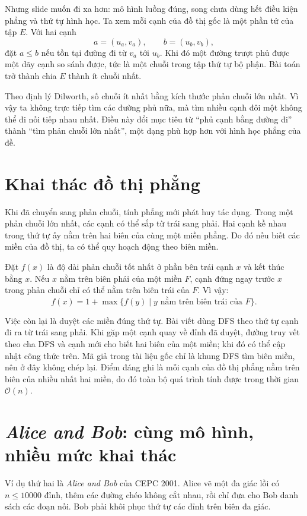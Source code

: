 \documentclass[11pt]{article}
\newcommand{\Oh}{\mathcal{O}}
\begin{document}
Nhưng slide muốn đi xa hơn: mô hình luồng đúng, song chưa dùng hết điều kiện
phẳng và thứ tự hình học. Ta xem mỗi cạnh của đồ thị gốc là một phần tử của
tập \(E\). Với hai cạnh
\[
  a=(u_a,v_a),\qquad b=(u_b,v_b),
\]
đặt \(a\le b\) nếu tồn tại đường đi từ \(v_a\) tới \(u_b\). Khi đó một đường
trượt phủ được một dãy cạnh so sánh được, tức là một chuỗi trong tập thứ tự bộ
phận. Bài toán trở thành chia \(E\) thành ít chuỗi nhất.

Theo định lý Dilworth, số chuỗi ít nhất bằng kích thước phản chuỗi lớn nhất.
Vì vậy ta không trực tiếp tìm các đường phủ nữa, mà tìm nhiều cạnh đôi một
không thể đi nối tiếp nhau nhất. Điều này đổi mục tiêu từ ``phủ cạnh bằng
đường đi'' thành ``tìm phản chuỗi lớn nhất'', một dạng phù hợp hơn với hình
học phẳng của đề.

\section{Khai thác đồ thị phẳng}

Khi đã chuyển sang phản chuỗi, tính phẳng mới phát huy tác dụng. Trong một
phản chuỗi lớn nhất, các cạnh có thể sắp từ trái sang phải. Hai cạnh kề nhau
trong thứ tự ấy nằm trên hai biên của cùng một miền phẳng. Do đó nếu biết các
miền của đồ thị, ta có thể quy hoạch động theo biên miền.

Đặt \(f(x)\) là độ dài phản chuỗi tốt nhất ở phần bên trái cạnh \(x\) và kết
thúc bằng \(x\). Nếu \(x\) nằm trên biên phải của một miền \(F\), cạnh đứng
ngay trước \(x\) trong phản chuỗi chỉ có thể nằm trên biên trái của \(F\).
Vì vậy:
\[
  f(x)=1+\max\{f(y)\mid y\text{ nằm trên biên trái của }F\}.
\]

Việc còn lại là duyệt các miền đúng thứ tự. Bài viết dùng DFS theo thứ tự
cạnh đi ra từ trái sang phải. Khi gặp một cạnh quay về đỉnh đã duyệt, đường
truy vết theo cha DFS và cạnh mới cho biết hai biên của một miền; khi đó có
thể cập nhật công thức trên. Mã giả trong tài liệu gốc chỉ là khung DFS tìm
biên miền, nên ở đây không chép lại. Điểm đáng ghi là mỗi cạnh của đồ thị
phẳng nằm trên biên của nhiều nhất hai miền, do đó toàn bộ quá trình tính
được trong thời gian \(\Oh(n)\).

\section{\textit{Alice and Bob}: cùng mô hình, nhiều mức khai thác}

Ví dụ thứ hai là \textit{Alice and Bob} của CEPC 2001. Alice vẽ một đa giác
lồi có \(n\le 10000\) đỉnh, thêm các đường chéo không cắt nhau, rồi chỉ đưa
cho Bob danh sách các đoạn nối. Bob phải khôi phục thứ tự các đỉnh trên biên
đa giác.
\end{document}
